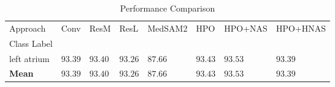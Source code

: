 \begin{table}
\caption{Performance Comparison}
\label{tab:results}
\begin{tabular}{llllllll}
\toprule
Approach & Conv & ResM & ResL & MedSAM2 & HPO & HPO+NAS & HPO+HNAS \\
Class Label &  &  &  &  &  &  &  \\
\midrule
left atrium & $93.39$ & $93.40$ & $93.26$ & $87.66$ & $93.43$ & $\mathbf{93.53}$ & $93.39$ \\
\textbf{Mean} & $93.39$ & $93.40$ & $93.26$ & $87.66$ & $93.43$ & $\mathbf{93.53}$ & $93.39$ \\
\bottomrule
\end{tabular}
\end{table}
